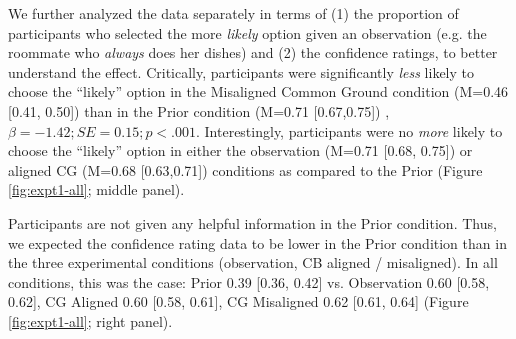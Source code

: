 \documentclass[10pt,letterpaper]{article}
\begin{document}
%
%
%
%

We further analyzed the data separately in terms of (1) the proportion of participants who selected the more \emph{likely} option given an observation (e.g. the roommate who \emph{always} does her dishes) and (2) the confidence ratings, to better understand the effect.
Critically, participants were significantly \emph{less} likely to choose the ``likely'' option in the Misaligned Common Ground condition (M=0.46 [0.41, 0.50]) than in the Prior condition (M=0.71 [0.67,0.75]) , $\beta = -1.42; SE = 0.15; p < .001$.  
Interestingly, participants were no \emph{more} likely to choose the ``likely'' option in either the observation (M=0.71 [0.68, 0.75]) or aligned CG (M=0.68 [0.63,0.71]) conditions as compared to the Prior (Figure \ref{fig:expt1-all}; middle panel).




Participants are not given any helpful information in the Prior condition. 
Thus, we expected the confidence rating data to be lower in the Prior condition than in the three experimental conditions (observation, CB aligned / misaligned).
In all conditions, this was the case: Prior 0.39 [0.36, 0.42] vs. Observation 0.60 [0.58, 0.62], CG Aligned 0.60 [0.58, 0.61], CG Misaligned 0.62 [0.61, 0.64] (Figure \ref{fig:expt1-all}; right panel).
\end{document}
